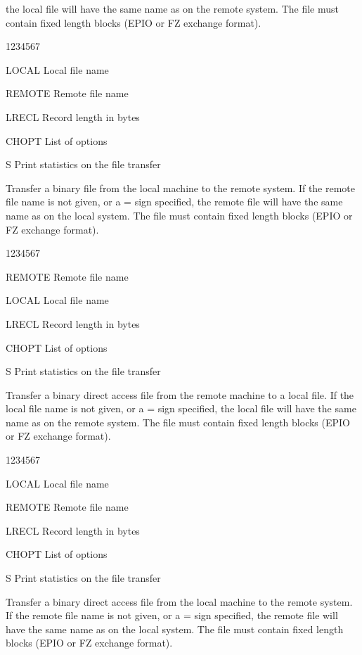 the local file will have the same name as on the remote system.
The file must contain fixed length blocks (EPIO or FZ exchange format).
\begin{DLtt}{1234567}
\item[LOCAL]Local file name
\item[REMOTE]Remote file name
\item[LRECL]Record length in bytes
\item[CHOPT]List of options
\begin{DLtt}{12}
\item[S]Print statistics on the file transfer
\end{DLtt}
\end{DLtt}
Transfer a binary file from the local machine to the remote system.
If the remote file name is not given, or a = sign specified,
the remote file will have the same name as on the local system.
The file must contain fixed length blocks (EPIO
or FZ exchange format).
\begin{DLtt}{1234567}
\item[REMOTE]Remote file name
\item[LOCAL]Local file name
\item[LRECL]Record length in bytes
\item[CHOPT]List of options
\begin{DLtt}{12}
\item[S]Print statistics on the file transfer
\end{DLtt}
\end{DLtt}
Transfer a binary direct access
file from the remote machine to a local file.
If the local file name is not given, or a = sign specified,
the local file will have the same name as on the remote system.
The file must contain
fixed length blocks (EPIO or FZ exchange format).

\begin{DLtt}{1234567}
\item[LOCAL]Local file name
\item[REMOTE]Remote file name
\item[LRECL]Record length in bytes
\item[CHOPT]List of options
\begin{DLtt}{12}
\item[S]Print statistics on the file transfer
\end{DLtt}
\end{DLtt}
Transfer a binary direct access
file from the local machine to the remote system.
If the remote file name is not given, or a = sign specified,
the remote file will have the same name as on the local system.
The file must contain fixed length blocks (EPIO
or FZ exchange format).

